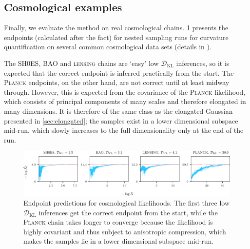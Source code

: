 \documentclass[usenatbib]{mnras}
\newcommand{\DKL}{\mathcal{D}_\mathrm{KL}}
\begin{document}
\subsection{Cosmological examples}
Finally, we evaluate the method on real cosmological chains. \cref{fig:lcdm_logXfs} presents the endpoints (calculated after the fact) for nested sampling runs for curvature quantification on several common cosmological data sets (details in \citealt{curvature_tension}). 
\par
The \textsc{SH0ES}, \textsc{BAO} and \textsc{lensing} chains are `easy' low $\DKL$ inferences, so it is expected that the correct endpoint is inferred practically from the start. The \textsc{Planck} endpoints, on the other hand, are not correct until at least midway through. However, this is expected from the covariance of the \textsc{Planck} likelihood, which consists of principal components of many scales and therefore elongated in many dimensions. It is therefore of the same class as the elongated Gaussian presented in \cref{sec:elongated}; the samples exist in a lower dimensional subspace mid-run, which slowly increases to the full dimensionality only at the end of the run.
\begin{figure}
\begin{center}
    \includegraphics{figures/lcdm_logXfs.pdf}
\end{center}
\caption{Endpoint predictions for cosmological likelihoods. The first three low $\DKL$ inferences get the correct endpoint from the start, while the \textsc{Planck} chain takes longer to converge because the likelihood is highly covariant and thus subject to anisotropic compression, which makes the samples lie in a lower dimensional subspace mid-run.}
\label{fig:lcdm_logXfs}
\end{figure}
\end{document}

